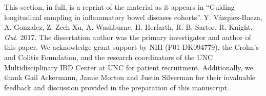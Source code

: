 This section, in full, is a reprint of the material as it appears in ``Guiding 
longitudinal sampling in inflammatory bowel diseases cohorts''. Y.  
V\'azquez-Baeza, A. Gonzalez, Z. Zech Xu, A. Washburne, H.  Herfarth, R.  B.  
Sartor, R. Knight. \emph{Gut}. 2017. The dissertation author was the 
primary investigator and author of this paper. We acknowledge grant support by 
NIH (P01-DK094779), the Crohn's and Colitis Foundation, and the research 
coordinators of the UNC Multidisciplinary IBD Center at UNC for patient 
recruitment. Additionally, we thank Gail Ackermann, Jamie Morton and Justin 
Silverman for their invaluable feedback and discussion provided in the 
preparation of this manuscript.
